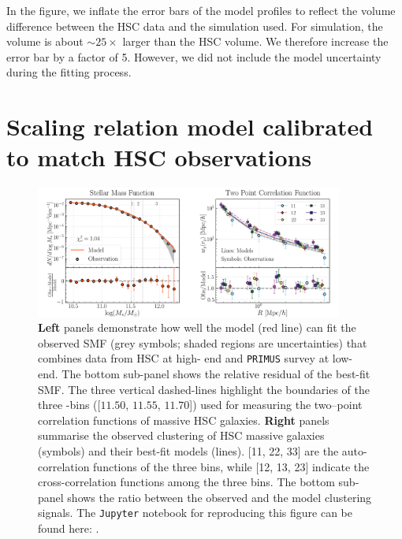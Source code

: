 \documentclass[fleqn,usenatbib,useAMS]{mnras}
\begin{document}
    In the figure, we inflate the error bars of the
    model profiles to reflect the volume difference between the HSC data and the simulation
    used. For  simulation, the volume is about $\sim 25 \times$ larger than the HSC
    volume. We therefore increase the error bar by a factor of 5. However, we did not
    include the model uncertainty during the fitting process. 

\section{Scaling relation model calibrated to match HSC observations}
    \label{app:hsc_model}

\begin{figure}
  \centering
  \includegraphics[width=0.9\textwidth]{figure/fig_B1}
  \caption{
      \textbf{Left} panels demonstrate how well the model (red line) can fit the observed SMF
      (grey symbols; shaded regions are uncertainties) that combines data from HSC at high-\mstar{}
      end and \texttt{PRIMUS} survey at low-\mstar{} end.
      The bottom sub-panel shows the relative residual of the best-fit SMF.
      The three vertical dashed-lines highlight the \mstar{} boundaries of the three \mstar{}-bins
      ([$11.50$, $11.55$, $11.70$]) used for measuring the two--point correlation functions of massive
      HSC galaxies.
      \textbf{Right} panels summarise the observed clustering of HSC massive galaxies (symbols)
      and their best-fit models (lines).
      [11, 22, 33] are the auto-correlation functions of the three \mstar{} bins, while
      [12, 13, 23] indicate the cross-correlation functions among the three bins.
      The bottom sub-panel shows the ratio between the observed and the model clustering signals.
        The \texttt{Jupyter} notebook for reproducing this figure can be found here:
        \href{https://github.com/dr-guangtou/jianbing/blob/master/notebooks/figure/figB1.ipynb}{\faGithub}.
    }
  \label{fig:best_mock}
\end{figure}
\end{document}
